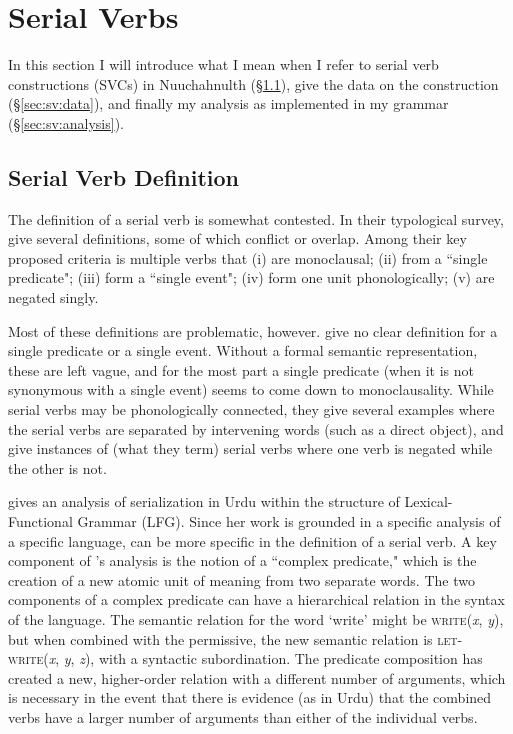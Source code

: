 \chapter{Serial Verbs}
\label{sec:sv}

In this section I will introduce what I mean when I refer to serial verb constructions (SVCs) in Nuuchahnulth (\S\ref{sec:sv:def}), give the data on the construction (\S\ref{sec:sv:data}), and finally my analysis as implemented in my grammar (\S\ref{sec:sv:analysis}).

\section{Serial Verb Definition} \label{sec:sv:def}

The definition of a serial verb is somewhat contested. In their typological survey, \cite{aikhenvalddixon2006} give several definitions, some of which conflict or overlap. Among their key proposed criteria is multiple verbs that (i) are monoclausal; (ii) from a ``single predicate"; (iii) form a ``single event"; (iv) form one unit phonologically; (v) are negated singly.

Most of these definitions are problematic, however. \citeauthor{aikhenvalddixon2006} give no clear definition for a single predicate or a single event. Without a formal semantic representation, these are left vague, and for the most part a single predicate (when it is not synonymous with a single event) seems to come down to monoclausality. While serial verbs may be phonologically connected, they give several examples where the serial verbs are separated by intervening words (such as a direct object), and give instances of (what they term) serial verbs where one verb is negated while the other is not.

\cite{butt1995} gives an analysis of serialization in Urdu within the structure of Lexical-Functional Grammar (LFG). Since her work is grounded in a specific analysis of a specific language, \citeauthor{butt1995} can be more specific in the definition of a serial verb. A key component of \citeauthor{butt1995}'s analysis is the notion of a ``complex predicate," which is the creation of a new atomic unit of meaning from two separate words. The two components of a complex predicate can have a hierarchical relation in the syntax of the language. The semantic relation for the word `write' might be \textsc{write}(\textit{x}, \textit{y}), but when combined with the permissive, the new semantic relation is \textsc{let-write}(\textit{x}, \textit{y}, \textit{z}), with a syntactic subordination. The predicate composition has created a new, higher-order relation with a different number of arguments, which is necessary in the event that there is evidence (as in Urdu) that the combined verbs have a larger number of arguments than either of the individual verbs.

